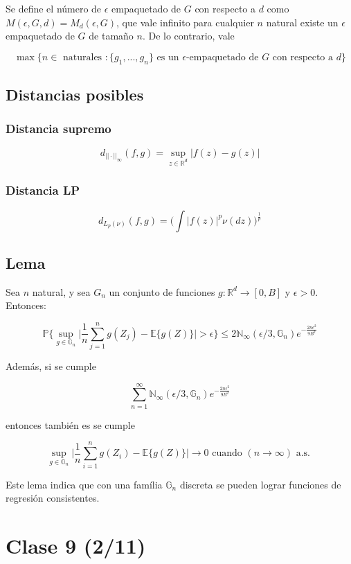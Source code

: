 \documentclass[12pt, a4paper]{article}
\begin{document}
Se define el número de $\epsilon$ empaquetado de $G$ con respecto a $d$ como $M(\epsilon,G,d)=M_d(\epsilon,G)$, que vale infinito para cualquier $n$ natural existe un $\epsilon$ empaquetado de $G$ de tamaño $n$. De lo contrario, vale

$$ \mathop{max}\big \{ n\in \text{ naturales }: \{ g_1, ..., g_n \} \text{ es un $\epsilon$-empaquetado de $G$ con respecto a $d$} \big \} $$

\subsection{Distancias posibles}
\subsubsection{Distancia supremo}
$$ d_{||\cdot||_{\infty}}(f,g)=\mathop{sup}_{z\in \mathds{R}^d}|f(z)-g(z)| $$
\subsubsection{Distancia LP}

$$ d_{L_p(\nu)}(f,g)=\bigg ( \int |f(z)|^p \nu(dz) \bigg )^{\frac{1}{p}}$$

\subsection{Lema}

Sea $n$ natural, y sea $G_n$ un conjunto de funciones $g:\mathds{R}^d \rightarrow [0,B]$ y $\epsilon > 0$. Entonces:

$$
\mathds{P}\Bigg \{ \mathop{sup}_{g\in \mathds{G}_n} \Big | \frac{1}{n} \sum_{j=1}^n g(Z_j)-\mathds{E}\{ g(Z) \} \Big | > \epsilon \Bigg \} \leq 2 \mathds{N}_{\infty} (\epsilon/3,\mathds{G}_n) e^{-\frac{2n\epsilon^2}{9B^2}}
$$

Además, si se cumple

$$
\sum_{n=1}^{\infty} \mathds{N}_{\infty} (\epsilon/3,\mathds{G}_n)e^{-\frac{2n\epsilon^2}{9B^2}}
$$

entonces también es se cumple

$$ \mathop{sup}_{g\in\mathds{G}_n} \Bigg | \frac{1}{n} \sum_{i=1}^n g(Z_i) - \mathds{E}\{g(Z)\} \Bigg | \rightarrow 0 \text{ cuando } (n\rightarrow \infty) \text{ a.s. }$$

Este lema indica que con una família $\mathds{G}_n$ discreta se pueden lograr funciones de regresión consistentes.

\section{Clase 9 (2/11)}
\end{document}
